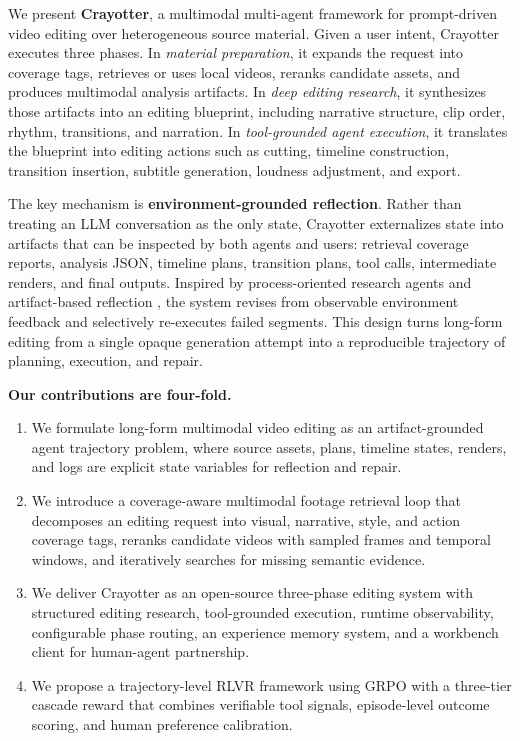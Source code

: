 ﻿\documentclass[11pt]{article}
\begin{document}
We present \textbf{Crayotter}, a multimodal multi-agent framework for
prompt-driven video editing over heterogeneous source material. Given a user
intent, Crayotter executes three phases. In \emph{material preparation}, it
expands the request into coverage tags, retrieves or uses local videos, reranks
candidate assets, and produces multimodal analysis artifacts. In \emph{deep
editing research}, it synthesizes those artifacts into an editing blueprint,
including narrative structure, clip order, rhythm, transitions, and narration.
In \emph{tool-grounded agent execution}, it translates the blueprint into
editing actions such as cutting, timeline construction, transition insertion,
subtitle generation, loudness adjustment, and export.

The key mechanism is \textbf{environment-grounded reflection}. Rather than
treating an LLM conversation as the only state, Crayotter externalizes state
into artifacts that can be inspected by both agents and users: retrieval
coverage reports, analysis JSON, timeline plans, transition plans, tool calls,
intermediate renders, and final outputs. Inspired by process-oriented research
agents and artifact-based reflection \cite{researStudio25,deepPresenter26}, the
system revises from observable environment feedback and selectively re-executes
failed segments. This design turns long-form editing from a single opaque
generation attempt into a reproducible trajectory of planning, execution, and
repair.

\textbf{Our contributions are four-fold.}
\begin{enumerate}
\item We formulate long-form multimodal video editing as an
artifact-grounded agent trajectory problem, where source assets, plans, timeline
states, renders, and logs are explicit state variables for reflection and
repair.
\item We introduce a coverage-aware multimodal footage retrieval loop that
decomposes an editing request into visual, narrative, style, and action
coverage tags, reranks candidate videos with sampled frames and temporal
windows, and iteratively searches for missing semantic evidence.
\item We deliver Crayotter as an open-source three-phase editing system with
structured editing research, tool-grounded execution, runtime observability,
configurable phase routing, an experience memory system, and a workbench client
for human-agent partnership.
\item We propose a trajectory-level RLVR framework using GRPO with a three-tier
cascade reward that combines verifiable tool signals, episode-level outcome
scoring, and human preference calibration.
\end{enumerate}
\end{document}
